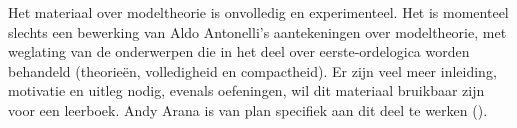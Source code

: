 \documentclass[../../include/open-logic-part]{subfiles}
\begin{document}

\begin{editorial}
  Het materiaal over modeltheorie is onvolledig en experimenteel. Het is
  momenteel slechts een bewerking van Aldo Antonelli's aantekeningen over
  modeltheorie, met weglating van de onderwerpen die in het deel over
  eerste-ordelogica worden behandeld (theorieën, volledigheid en compactheid).
  Er zijn veel meer inleiding, motivatie en uitleg nodig, evenals oefeningen,
  wil dit materiaal bruikbaar zijn voor een leerboek. Andy Arana is van plan
  specifiek aan dit deel te werken ().
\end{editorial}





\OLEndPartHook
\end{document}
